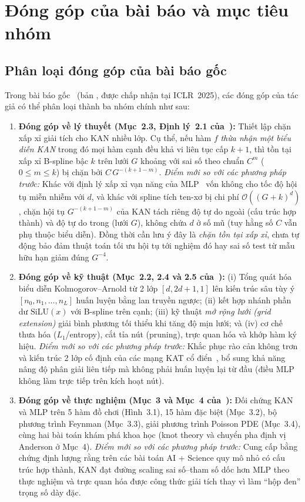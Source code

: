 \section{Đóng góp của bài báo và mục tiêu nhóm}
\label{sec:contributions-scope}
\subsection{Phân loại đóng góp của bài báo gốc}
Trong bài báo gốc~\cite{liu2025kan} (bản , được chấp nhận tại ICLR~2025), các đóng góp của tác giả có thể phân loại thành ba nhóm chính như sau:

\begin{enumerate}
\item \textbf{Đóng góp về lý thuyết (Mục~2.3, Định lý~2.1 của~\cite{liu2025kan}):} Thiết lập chặn xấp xỉ giải tích cho KAN nhiều lớp. Cụ thể, nếu hàm $f$ \emph{thừa nhận một biểu diễn KAN} trong đó mọi hàm cạnh đều khả vi liên tục cấp $k+1$, thì tồn tại xấp xỉ B-spline bậc $k$ trên lưới $G$ khoảng với sai số theo chuẩn $C^m$ ($0 \le m \le k$) bị chặn bởi $C\,G^{-(k+1-m)}$. \emph{Điểm mới so với các phương pháp trước:} Khác với định lý xấp xỉ vạn năng của MLP~\cite{hornik1989multilayer} vốn không cho tốc độ hội tụ miễn nhiễm với $d$, và khác với spline tích ten-xơ bị chi phí $\mathcal{O}((G+k)^d)$, chặn hội tụ $G^{-(k+1-m)}$ của KAN tách riêng độ tự do ngoài (cấu trúc hợp thành) và độ tự do trong (lưới $G$), không chứa $d$ ở số mũ (tuy hằng số $C$ vẫn phụ thuộc biểu diễn). Đồng thời cần lưu ý đây là \emph{chặn tồn tại xấp xỉ}, chưa tự động bảo đảm thuật toán tối ưu hội tụ tới nghiệm đó hay sai số test từ mẫu hữu hạn giảm đúng $G^{-4}$.
\item \textbf{Đóng góp về kỹ thuật (Mục~2.2, 2.4 và 2.5 của~\cite{liu2025kan}):} (i) Tổng quát hóa biểu diễn Kolmogorov--Arnold từ 2 lớp $[d, 2d+1, 1]$ lên kiến trúc sâu tùy ý $[n_0, n_1, \dots, n_L]$ huấn luyện bằng lan truyền ngược; (ii) kết hợp nhánh phần dư $\mathrm{SiLU}(x)$ với B-spline trên cạnh; (iii) kỹ thuật \emph{mở rộng lưới (grid extension)} giải bình phương tối thiểu khi tăng độ mịn lưới; và (iv) cơ chế thưa hóa ($L_1$/entropy), cắt tỉa nút (pruning), trực quan hóa và khớp hàm ký hiệu. \emph{Điểm mới so với các phương pháp trước:} Khắc phục rào cản không trơn và kiến trúc 2 lớp cố định của các mạng KAT cổ điển~\cite{girosi1989representation}, bổ sung khả năng nâng độ phân giải liên tiếp mà không phải huấn luyện lại từ đầu (điều MLP không làm trực tiếp trên kích hoạt nút).
\item \textbf{Đóng góp về thực nghiệm (Mục~3 và Mục~4 của~\cite{liu2025kan}):} Đối chứng KAN và MLP trên 5 hàm đồ chơi (Hình~3.1), 15 hàm đặc biệt (Mục~3.2), bộ phương trình Feynman (Mục~3.3), giải phương trình Poisson PDE (Mục~3.4), cùng hai bài toán khám phá khoa học (knot theory và chuyển pha định vị Anderson ở Mục~4). \emph{Điểm mới so với các phương pháp trước:} Cung cấp bằng chứng định lượng rằng trên các bài toán AI + Science quy mô nhỏ có cấu trúc hợp thành, KAN đạt đường scaling sai số--tham số dốc hơn MLP theo thực nghiệm và trực quan hóa được công thức giải tích thay vì làm ``hộp đen'' trọng số dày đặc.
\end{enumerate}


